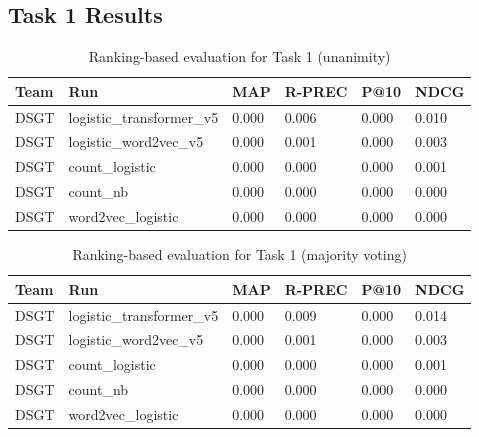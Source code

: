 \documentclass[]{style/ceurart}
\begin{document}
\subsection{Task 1 Results}

\begin{table}[]
\caption{Ranking-based evaluation for Task 1 (unanimity)}
\begin{tabular}{llllll}
Team & Run                       & MAP   & R-PREC & P@10 & NDCG  \\
\toprule
DSGT & logistic\_transformer\_v5 & 0.000 & 0.006  & 0.000                             & 0.010 \\
DSGT & logistic\_word2vec\_v5    & 0.000 & 0.001  & 0.000                             & 0.003 \\
DSGT & count\_logistic           & 0.000 & 0.000  & 0.000                             & 0.001 \\
DSGT & count\_nb                 & 0.000 & 0.000  & 0.000                             & 0.000 \\
DSGT & word2vec\_logistic        & 0.000 & 0.000  & 0.000                             & 0.000
\end{tabular}
\end{table}

\begin{table}[]
\caption{Ranking-based evaluation for Task 1 (majority voting)}
\begin{tabular}{llllll}
Team & Run                       & MAP   & R-PREC & P@10 & NDCG  \\
\toprule
DSGT & logistic\_transformer\_v5 & 0.000 & 0.009  & 0.000                             & 0.014 \\
DSGT & logistic\_word2vec\_v5    & 0.000 & 0.001  & 0.000                             & 0.003 \\
DSGT & count\_logistic           & 0.000 & 0.000  & 0.000                             & 0.001 \\
DSGT & count\_nb                 & 0.000 & 0.000  & 0.000                             & 0.000 \\
DSGT & word2vec\_logistic        & 0.000 & 0.000  & 0.000                             & 0.000
\end{tabular}
\end{table}
\end{document}
